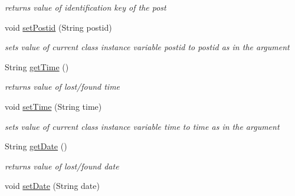 \begin{DoxyCompactItemize}
\begin{DoxyCompactList}\small\item\em returns value of identification key of the post \end{DoxyCompactList}\item 
\hypertarget{classcom_1_1example_1_1sel_1_1lostfound_1_1UserPost_aa5da2d50f9359ab1899b0b59bb3f2738}{void \hyperlink{classcom_1_1example_1_1sel_1_1lostfound_1_1UserPost_aa5da2d50f9359ab1899b0b59bb3f2738}{set\-Postid} (\-String postid)}\label{classcom_1_1example_1_1sel_1_1lostfound_1_1UserPost_aa5da2d50f9359ab1899b0b59bb3f2738}

\begin{DoxyCompactList}\small\item\em sets value of current class instance variable postid to postid as in the argument \end{DoxyCompactList}\item 
\hypertarget{classcom_1_1example_1_1sel_1_1lostfound_1_1UserPost_a9f0a4da541ebc349fca11bbd83757288}{\-String \hyperlink{classcom_1_1example_1_1sel_1_1lostfound_1_1UserPost_a9f0a4da541ebc349fca11bbd83757288}{get\-Time} ()}\label{classcom_1_1example_1_1sel_1_1lostfound_1_1UserPost_a9f0a4da541ebc349fca11bbd83757288}

\begin{DoxyCompactList}\small\item\em returns value of lost/found time \end{DoxyCompactList}\item 
\hypertarget{classcom_1_1example_1_1sel_1_1lostfound_1_1UserPost_ae6ad4007a7fc1bffaa505d2d70825668}{void \hyperlink{classcom_1_1example_1_1sel_1_1lostfound_1_1UserPost_ae6ad4007a7fc1bffaa505d2d70825668}{set\-Time} (\-String time)}\label{classcom_1_1example_1_1sel_1_1lostfound_1_1UserPost_ae6ad4007a7fc1bffaa505d2d70825668}

\begin{DoxyCompactList}\small\item\em sets value of current class instance variable time to time as in the argument \end{DoxyCompactList}\item 
\hypertarget{classcom_1_1example_1_1sel_1_1lostfound_1_1UserPost_a6d959a32b2aaa20c3a501e60901214e6}{\-String \hyperlink{classcom_1_1example_1_1sel_1_1lostfound_1_1UserPost_a6d959a32b2aaa20c3a501e60901214e6}{get\-Date} ()}\label{classcom_1_1example_1_1sel_1_1lostfound_1_1UserPost_a6d959a32b2aaa20c3a501e60901214e6}

\begin{DoxyCompactList}\small\item\em returns value of lost/found date \end{DoxyCompactList}\item 
\hypertarget{classcom_1_1example_1_1sel_1_1lostfound_1_1UserPost_a617b2479a85c78119a7d59d046b6edc2}{void \hyperlink{classcom_1_1example_1_1sel_1_1lostfound_1_1UserPost_a617b2479a85c78119a7d59d046b6edc2}{set\-Date} (\-String date)}\label{classcom_1_1example_1_1sel_1_1lostfound_1_1UserPost_a617b2479a85c78119a7d59d046b6edc2}


\end{DoxyCompactItemize}
